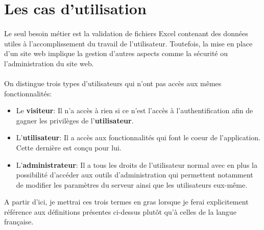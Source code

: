 \section{Les cas d'utilisation}
\label{sec:use-cases}

\paragraph{}
Le seul besoin métier est la validation de fichiers Excel contenant des données utiles à l'accomplissement du travail de l'utilisateur. Toutefois, la mise en place d'un site web implique la gestion d'autres aspects comme la sécurité ou l'administration du site web.

\paragraph{}
On distingue trois types d'utilisateurs qui n'ont pas accès aux mêmes fonctionnalités:
\begin{itemize}
    \item Le \textbf{visiteur}: Il n'a accès à rien si ce n'est l'accès à l'authentification afin de gagner les privilèges de l'\textbf{utilisateur}.
    \item L'\textbf{utilisateur}: Il a accès aux fonctionnalités qui font le coeur de l'application. Cette dernière est conçu pour lui.
    \item L'\textbf{administrateur}: Il a tous les droits de l'utilisateur normal avec en plus la possibilité d'accéder aux outils d'administration qui permettent notamment de modifier les paramètres du serveur ainsi que les utilisateurs eux-même.
\end{itemize}

A partir d'ici, je mettrai ces trois termes en gras lorsque je ferai explicitement référence aux définitions présentes ci-dessus plutôt qu'à celles de la langue française.








